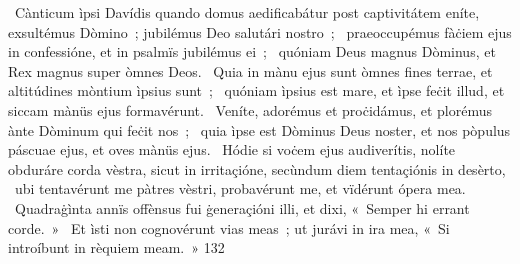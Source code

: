 {~Cànticum ìpsi Davídis quando domus aedificabátur post captivitátem}
{%
eníte, exsultémus Dòmino~; jubilémus Deo salutári nostro~;
~praeoccupémus fàċiem ejus in confessióne, et in psalmïs jubilémus ei~;
~quóniam Deus magnus Dòminus, et Rex magnus super òmnes Deos.
~Quia in mànu ejus sunt òmnes fines terrae, et altitúdines mòntium ìpsius sunt~;
~quóniam ìpsius est mare, et ìpse feċit illud, et siccam mànüs ejus formavérunt.
~Veníte, adorémus et proċidámus, et plorémus ànte Dòminum qui feċit nos~;
~quia ìpse est Dòminus Deus noster, et nos pòpulus páscuae ejus, et oves mànüs ejus.
~Hódie si voċem ejus audiverítis, nolíte obduráre corda vèstra, sicut in irritaçióne, secùndum diem tentaçiónis in desèrto,
~ubi tentavérunt me pàtres vèstri, probavérunt me, et vïdérunt ópera mea.
~Quadraġìnta annïs offènsus fui ġeneraçióni illi, et dixi, «~Semper hi errant corde.~»
~Et ìsti non cognovérunt vias meas~; ut jurávi in ira mea, «~Si introíbunt in rèquiem meam.~»
}
{13}{2}
